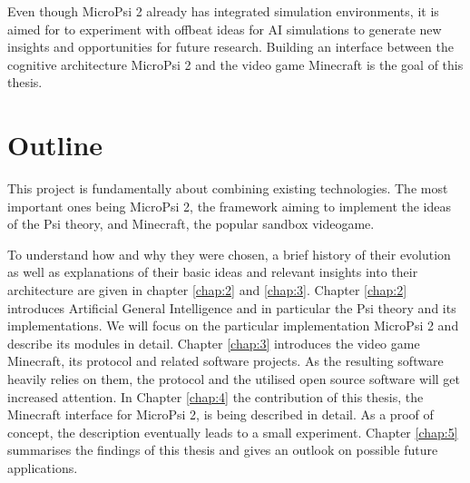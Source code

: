 Even though MicroPsi 2 already has integrated simulation environments, it is aimed for to experiment with offbeat ideas for AI simulations to generate new insights and opportunities for future research. Building an interface between the cognitive architecture MicroPsi 2 and the video game Minecraft is the goal of this thesis.

\section{Outline}
This project is fundamentally about combining existing technologies. The most important ones being MicroPsi 2, the framework aiming to implement the ideas of the Psi theory, and Minecraft, the popular sandbox videogame.

To understand how and why they were chosen, a brief history of their evolution as well as explanations of their basic ideas and relevant insights into their architecture are given in chapter \ref{chap:2} and \ref{chap:3}. Chapter \ref{chap:2} introduces Artificial General Intelligence and in particular the Psi theory and its implementations. We will focus on the particular implementation MicroPsi 2 and describe its modules in detail. Chapter \ref{chap:3} introduces the video game Minecraft, its protocol and related software projects. As the resulting software heavily relies on them, the protocol and the utilised open source software will get increased attention. 
In Chapter \ref{chap:4} the contribution of this thesis, the Minecraft interface for MicroPsi 2, is being described in detail. As a proof of concept, the description eventually leads to a small experiment.
Chapter \ref{chap:5} summarises the findings of this thesis and gives an outlook on possible future applications.